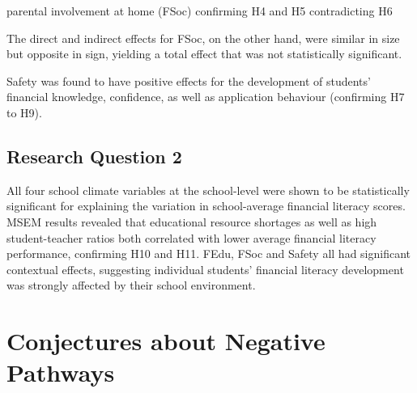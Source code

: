 \documentclass[a4paper,11pt,UKenglish,twoside,openright]{report}\usepackage[]{graphicx}\usepackage[]{color}
\begin{document}
parental involvement at home (FSoc) confirming H4 and H5 contradicting H6

The direct and indirect effects for FSoc, on the other hand, were similar in size but opposite in sign, yielding a total effect that was not statistically significant.

Safety was found to have positive effects for the development of students' financial knowledge, confidence, as well as application behaviour (confirming H7 to H9).

\subsection{Research Question 2}

All four school climate variables at the school-level were shown to be statistically significant for explaining the variation in school-average financial literacy scores. MSEM results revealed that educational resource shortages as well as high student-teacher ratios both correlated with lower average financial literacy performance, confirming H10 and H11. FEdu, FSoc and Safety all had significant contextual effects, suggesting individual students' financial literacy development was strongly affected by their school environment.

\section{Conjectures about Negative Pathways}\label{sec:conj}
\end{document}
